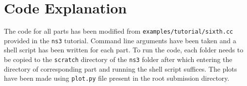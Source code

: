 \documentclass[11pt]{article}
\begin{document}
\section{Code Explanation}
The code for all parts has been modified from \texttt{examples/tutorial/sixth.cc} provided in the \texttt{ns3} tutorial. Command line arguments have been taken and a shell script has been written for each part. To run the code, each folder needs to be copied to the \texttt{scratch} directory of the \texttt{ns3} folder after which entering the directory of corresponding part and running the shell script suffices. The plots have been made using \texttt{plot.py} file present in the root submission directory.
\end{document}
